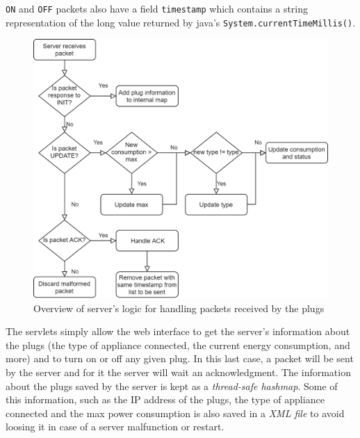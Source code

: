 \documentclass[conference]{IEEEtran}
\begin{document}
\verb|ON| and \verb|OFF| packets also have a field \verb|timestamp| which contains a string representation of the long value returned by java's \verb|System.currentTimeMillis()|.  
\begin{figure}
	\centering
	\includegraphics[width=\linewidth]{assets/server_logic}
	\caption{Overview of server's logic for handling packets received by the plugs}
	\label{fig:server_logic}
\end{figure}
The servlets simply allow the web interface to get the server's information about the plugs (the type of appliance connected, the current energy consumption, and more) and to turn on or off any given plug. In this last case, a packet will be sent by the server and for it the server will wait an acknowledgment. The information about the plugs saved by the server is kept as a \textit{thread-safe hashmap}. Some of this information, such as the IP address of the plugs, the type of appliance connected and the max power consumption is also saved in a \textit{XML file} to avoid loosing it in case of a server malfunction or restart.
\end{document}
